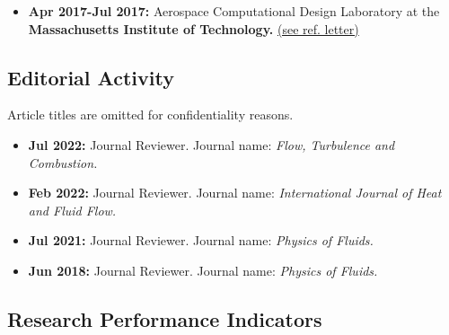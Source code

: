 \documentclass{article}
\begin{document}
\begin{itemize}
\item  {\bf Apr 2017-Jul 2017:} Aerospace Computational Design Laboratory at the {\bf Massachusetts Institute of Technology.} \hyperlink{mit.1}{(see ref. letter)}
\end{itemize}

\subsection{Editorial Activity}

Article titles are omitted for confidentiality reasons.

\begin{itemize}
\item  {\bf Jul 2022:} Journal Reviewer. Journal name: {\it Flow, Turbulence and Combustion.}
\item  {\bf Feb 2022:} Journal Reviewer. Journal name: {\it International Journal of Heat and Fluid Flow.}
\item  {\bf Jul 2021:} Journal Reviewer. Journal name: {\it Physics of Fluids.}
\item  {\bf Jun 2018:} Journal Reviewer. Journal name: {\it Physics of Fluids.}
\end{itemize}

\subsection{Research Performance Indicators}
\end{document}
